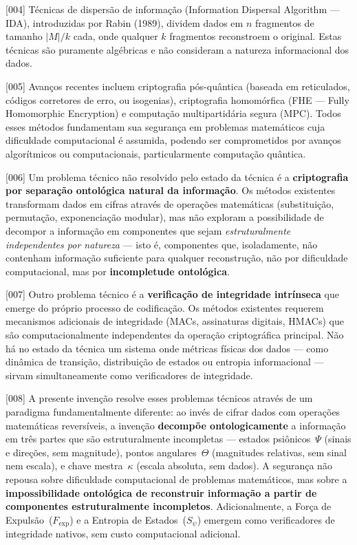 \documentclass[12pt,a4paper]{article}
\newcommand{\Fexp}{F_{\text{exp}}}
\begin{document}
{[004]} Técnicas de dispersão de informação (Information
Dispersal Algorithm --- IDA), introduzidas por Rabin (1989),
dividem dados em $n$ fragmentos de tamanho $|M|/k$ cada, onde
qualquer $k$ fragmentos reconstroem o original. Estas técnicas
são puramente algébricas e não consideram a natureza
informacional dos dados.

{[005]} Avanços recentes incluem criptografia pós-quântica
(baseada em reticulados, códigos corretores de erro, ou
isogenias), criptografia homomórfica (FHE --- Fully Homomorphic
Encryption) e computação multipartidária segura (MPC). Todos
esses métodos fundamentam sua segurança em problemas
matemáticos cuja dificuldade computacional é assumida, podendo
ser comprometidos por avanços algorítmicos ou computacionais,
particularmente computação quântica.

{[006]} Um problema técnico não resolvido pelo estado da técnica
é a \textbf{criptografia por separação ontológica natural da
informação}. Os métodos existentes transformam dados em cifras
através de operações matemáticas (substituição, permutação,
exponenciação modular), mas não exploram a possibilidade de
decompor a informação em componentes que sejam
\textit{estruturalmente independentes por natureza} --- isto é,
componentes que, isoladamente, não contenham informação
suficiente para qualquer reconstrução, não por dificuldade
computacional, mas por \textbf{incompletude ontológica}.

{[007]} Outro problema técnico é a \textbf{verificação de
integridade intrínseca} que emerge do próprio processo de
codificação. Os métodos existentes requerem mecanismos
adicionais de integridade (MACs, assinaturas digitais, HMACs)
que são computacionalmente independentes da operação
criptográfica principal. Não há no estado da técnica um sistema
onde métricas físicas dos dados --- como dinâmica de transição,
distribuição de estados ou entropia informacional --- sirvam
simultaneamente como verificadores de integridade.

{[008]} A presente invenção resolve esses problemas técnicos
através de um paradigma fundamentalmente diferente: ao invés de
cifrar dados com operações matemáticas reversíveis, a invenção
\textbf{decompõe ontologicamente} a informação em três partes
que são estruturalmente incompletas --- estados
psiônicos~$\Psi$ (sinais e direções, sem magnitude), pontos
angulares~$\Theta$ (magnitudes relativas, sem sinal nem
escala), e chave mestra~$\kappa$ (escala absoluta, sem dados).
A segurança não repousa sobre dificuldade computacional de
problemas matemáticos, mas sobre a \textbf{impossibilidade
ontológica de reconstruir informação a partir de componentes
estruturalmente incompletos}. Adicionalmente, a Força de
Expulsão~($\Fexp$) e a Entropia de Estados~($S_\psi$) emergem
como verificadores de integridade nativos, sem custo
computacional adicional.
\end{document}
